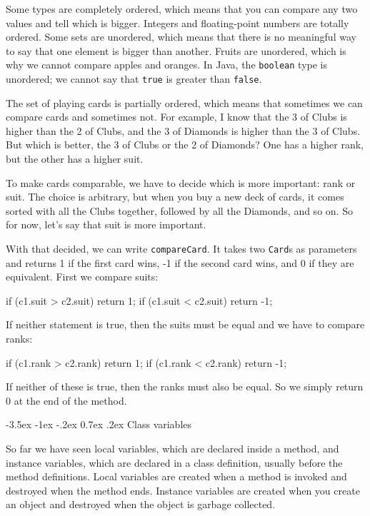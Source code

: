 \documentclass[12pt]{book}
\makeatletter
\renewcommand{\section}{\@startsection {section}{1}{\z@}%
    {-3.5ex \@plus -1ex \@minus -.2ex}%
    {0.7ex \@plus.2ex}%
    {\normalfont\Large\bfseries}}
\theoremstyle{exercise}
\newcommand{\java}[1]{\lstinline{#1}} %
\makeatother
\begin{document}
Some types are completely ordered, which means that you can compare any two values and tell which is bigger.
Integers and floating-point numbers are totally ordered.
Some sets are unordered, which means that there is no meaningful way to say that one element is bigger than another.
Fruits are unordered, which is why we cannot compare apples and oranges.
In Java, the \java{boolean} type is unordered; we cannot say that \java{true} is greater than \java{false}.

The set of playing cards is partially ordered, which means that sometimes we can compare cards and sometimes not.
For example, I know that the 3 of Clubs is higher than the 2 of Clubs, and the 3 of Diamonds is higher than the 3 of Clubs.
But which is better, the 3 of Clubs or the 2 of Diamonds?
One has a higher rank, but the other has a higher suit.


To make cards comparable, we have to decide which is more important: rank or suit.
The choice is arbitrary, but when you buy a new deck of cards, it comes sorted with all the Clubs together, followed by all the Diamonds, and so on.
So for now, let's say that suit is more important.

With that decided, we can write \java{compareCard}.
It takes two \java{Card}s as parameters and returns 1 if the first card wins, -1 if the second card wins, and 0 if they are equivalent.
First we compare suits:

\begin{code}
    if (c1.suit > c2.suit) {
        return 1;
    }
    if (c1.suit < c2.suit) {
        return -1;
    }
\end{code}

If neither statement is true, then the suits must be equal and we have to compare ranks:

\begin{code}
    if (c1.rank > c2.rank) {
        return 1;
    }
    if (c1.rank < c2.rank) {
        return -1;
    }
\end{code}

If neither of these is true, then the ranks must also be equal.
So we simply return 0 at the end of the method.


\section{Class variables}

So far we have seen local variables, which are declared inside a method, and instance variables, which are declared in a class
definition, usually before the method definitions.
Local variables are created when a method is invoked and destroyed when the method ends.
Instance variables are created when you create an object and destroyed when the object is garbage collected.
\end{document}
